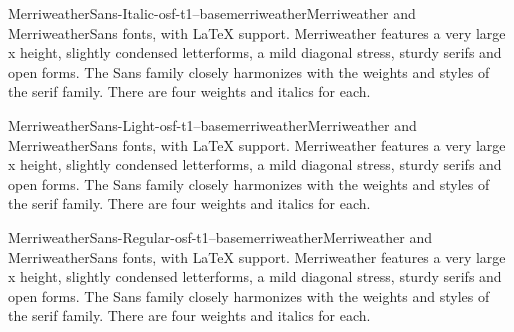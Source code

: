 \documentclass{ddltxtyp}
\begin{document}
\begin{package}{MerriweatherSans-Italic-osf-t1--base}{merriweather}{Merriweather and MerriweatherSans fonts, with {\LaTeX} support.}
Merriweather features a very large x height, slightly condensed
letterforms, a mild diagonal stress, sturdy serifs and open
forms. The Sans family closely harmonizes with the weights and
styles of the serif family. There are four weights and italics
for each.
\end{package}
\begin{package}{MerriweatherSans-Light-osf-t1--base}{merriweather}{Merriweather and MerriweatherSans fonts, with {\LaTeX} support.}
Merriweather features a very large x height, slightly condensed
letterforms, a mild diagonal stress, sturdy serifs and open
forms. The Sans family closely harmonizes with the weights and
styles of the serif family. There are four weights and italics
for each.
\end{package}
\begin{package}{MerriweatherSans-Regular-osf-t1--base}{merriweather}{Merriweather and MerriweatherSans fonts, with {\LaTeX} support.}
Merriweather features a very large x height, slightly condensed
letterforms, a mild diagonal stress, sturdy serifs and open
forms. The Sans family closely harmonizes with the weights and
styles of the serif family. There are four weights and italics
for each.
\end{package}
\end{document}
